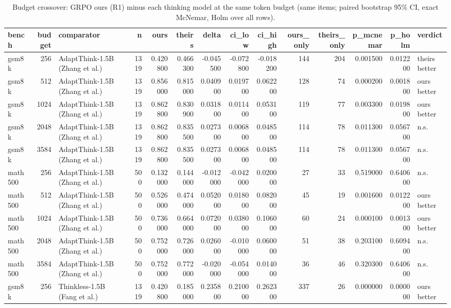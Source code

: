 \begin{table}
\caption{Budget crossover: GRPO ours (R1) minus each thinking model at the same token budget (same items; paired bootstrap 95\% CI, exact McNemar, Holm over all rows).}
\label{tab:crossover}
\begin{tabular}{lrlrrrrrrrrrrl}
\toprule
bench & budget & comparator & n & ours & theirs & delta & ci_low & ci_high & ours_only & theirs_only & p_mcnemar & p_holm & verdict \\
\midrule
gsm8k & 256 & AdaptThink-1.5B (Zhang et al.) & 1319 & 0.420800 & 0.466300 & -0.045500 & -0.072800 & -0.018200 & 144 & 204 & 0.001500 & 0.012200 & theirs better \\
gsm8k & 512 & AdaptThink-1.5B (Zhang et al.) & 1319 & 0.856000 & 0.815000 & 0.040900 & 0.019700 & 0.062200 & 128 & 74 & 0.000200 & 0.001800 & ours better \\
gsm8k & 1024 & AdaptThink-1.5B (Zhang et al.) & 1319 & 0.862800 & 0.830900 & 0.031800 & 0.011400 & 0.053100 & 119 & 77 & 0.003300 & 0.019800 & ours better \\
gsm8k & 2048 & AdaptThink-1.5B (Zhang et al.) & 1319 & 0.862800 & 0.835500 & 0.027300 & 0.006800 & 0.048500 & 114 & 78 & 0.011300 & 0.056700 & n.s. \\
gsm8k & 3584 & AdaptThink-1.5B (Zhang et al.) & 1319 & 0.862800 & 0.835500 & 0.027300 & 0.006800 & 0.048500 & 114 & 78 & 0.011300 & 0.056700 & n.s. \\
math500 & 256 & AdaptThink-1.5B (Zhang et al.) & 500 & 0.132000 & 0.144000 & -0.012000 & -0.042000 & 0.020000 & 27 & 33 & 0.519000 & 0.640600 & n.s. \\
math500 & 512 & AdaptThink-1.5B (Zhang et al.) & 500 & 0.526000 & 0.474000 & 0.052000 & 0.018000 & 0.082000 & 45 & 19 & 0.001600 & 0.012200 & ours better \\
math500 & 1024 & AdaptThink-1.5B (Zhang et al.) & 500 & 0.736000 & 0.664000 & 0.072000 & 0.038000 & 0.106000 & 60 & 24 & 0.000100 & 0.001300 & ours better \\
math500 & 2048 & AdaptThink-1.5B (Zhang et al.) & 500 & 0.752000 & 0.726000 & 0.026000 & -0.010000 & 0.060000 & 51 & 38 & 0.203100 & 0.609400 & n.s. \\
math500 & 3584 & AdaptThink-1.5B (Zhang et al.) & 500 & 0.752000 & 0.772000 & -0.020000 & -0.054000 & 0.014000 & 36 & 46 & 0.320300 & 0.640600 & n.s. \\
gsm8k & 256 & Thinkless-1.5B (Fang et al.) & 1319 & 0.420800 & 0.185000 & 0.235800 & 0.210000 & 0.262300 & 337 & 26 & 0.000000 & 0.000000 & ours better \\

\end{tabular}
\end{table}
